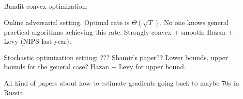 
Bandit convex optimization:

Online adversarial setting. Optimal rate is $\Theta(\sqrt{T})$.
No one knows general practical algorithms achieving this rate.
Strongly convex + smooth: Hazan + Levy (NIPS last year).

Stochastic optimization setting: ??? Shamir's paper??
Lower bounds, upper bounds for the general case?
Hazan + Levy for upper bound.

All kind of papers about how to estimate gradients going back to maybe 70s in Russia.
